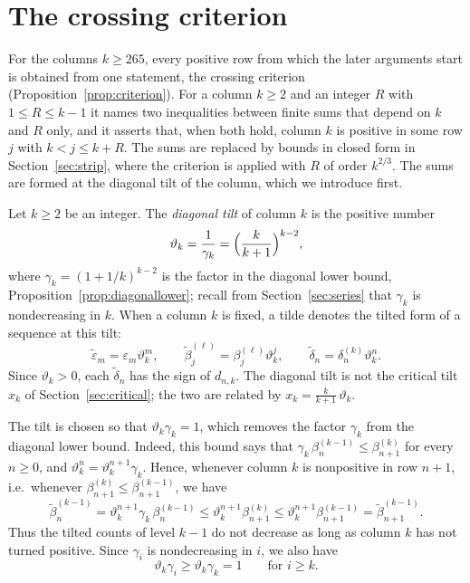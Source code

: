\documentclass{amsart}
\makeatletter
\theoremstyle{definition}
\theoremstyle{remark}
\numberwithin{equation}{section}
\def\subsection{\@startsection{subsection}{2}\z@{.5\linespacing\@plus.7\linespacing}{-.5em}{\normalfont\bfseries\boldmath}}
\makeatother
\begin{document}
\section{The crossing criterion}\label{sec:crossing}
For the columns $k\ge 265$, every positive row from which the later arguments start is obtained from one statement, the crossing criterion (Proposition~\ref{prop:criterion}). For a column $k\ge 2$ and an integer $R$ with $1\le R\le k-1$ it names two inequalities between finite sums that depend on $k$ and $R$ only, and it asserts that, when both hold, column $k$ is positive in some row $j$ with $k<j\le k+R$. The sums are replaced by bounds in closed form in Section~\ref{sec:strip}, where the criterion is applied with $R$ of order $k^{2/3}$. The sums are formed at the diagonal tilt of the column, which we introduce first.

\subsection{The diagonal tilt}\label{subsec:crossing-tilt}

Let $k\ge 2$ be an integer. The \emph{diagonal tilt} of column $k$ is the positive number
\[
\vartheta_k=\frac{1}{\gamma_k}=\Bigl(\frac{k}{k+1}\Bigr)^{k-2},
\]
where $\gamma_k=(1+1/k)^{k-2}$ is the factor in the diagonal lower bound, Proposition~\ref{prop:diagonallower}; recall from Section~\ref{sec:series} that $\gamma_k$ is nondecreasing in $k$. When a column $k$ is fixed, a tilde denotes the tilted form of a sequence at this tilt:
\[
\tilde\varepsilon_m=\varepsilon_m\vartheta_k^m,\qquad
\tilde\beta^{(\ell)}_j=\beta^{(\ell)}_j\vartheta_k^j,\qquad
\tilde\delta_n=\delta^{(k)}_n\vartheta_k^n .
\]
Since $\vartheta_k>0$, each $\tilde\delta_n$ has the sign of $d_{n,k}$. The diagonal tilt is not the critical tilt $x_k$ of Section~\ref{sec:critical}; the two are related by $x_k=\frac{k}{k+1}\,\vartheta_k$.

The tilt is chosen so that $\vartheta_k\gamma_k=1$, which removes the factor $\gamma_k$ from the diagonal lower bound. Indeed, this bound says that $\gamma_k\,\beta^{(k-1)}_n\le\beta^{(k)}_{n+1}$ for every $n\ge 0$, and $\vartheta_k^{n}=\vartheta_k^{n+1}\gamma_k$. Hence, whenever column $k$ is nonpositive in row $n+1$, i.e.\ whenever $\beta^{(k)}_{n+1}\le\beta^{(k-1)}_{n+1}$, we have
\begin{equation}\label{eq:crossing-monotone}
\tilde\beta^{(k-1)}_n=\vartheta_k^{n+1}\gamma_k\,\beta^{(k-1)}_n\le\vartheta_k^{n+1}\beta^{(k)}_{n+1}\le\vartheta_k^{n+1}\beta^{(k-1)}_{n+1}=\tilde\beta^{(k-1)}_{n+1}.
\end{equation}
Thus the tilted counts of level $k-1$ do not decrease as long as column $k$ has not turned positive. Since $\gamma_i$ is nondecreasing in $i$, we also have
\[
\vartheta_k\gamma_i\ge\vartheta_k\gamma_k=1\qquad\text{for } i\ge k .
\]
\end{document}
